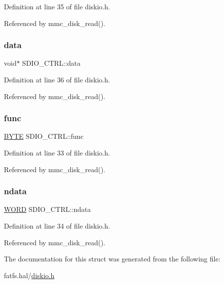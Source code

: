 Definition at line 35 of file diskio.\+h.



Referenced by mmc\+\_\+disk\+\_\+read().

\mbox{\label{structSDIO__CTRL_ab04c9adb4d3027a14925fb30b469f0c0}} 
\subsubsection{\texorpdfstring{data}{data}}
{\footnotesize\ttfamily void$\ast$ S\+D\+I\+O\+\_\+\+C\+T\+R\+L\+::data}



Definition at line 36 of file diskio.\+h.



Referenced by mmc\+\_\+disk\+\_\+read().

\mbox{\label{structSDIO__CTRL_a2f0a17848a6c7c58f826d1888469e6e3}} 
\subsubsection{\texorpdfstring{func}{func}}
{\footnotesize\ttfamily \hyperlink{integer_8h_a4ae1dab0fb4b072a66584546209e7d58}{B\+Y\+TE} S\+D\+I\+O\+\_\+\+C\+T\+R\+L\+::func}



Definition at line 33 of file diskio.\+h.



Referenced by mmc\+\_\+disk\+\_\+read().

\mbox{\label{structSDIO__CTRL_a44edc7d37688ac4f3a1ba3d66e909767}} 
\subsubsection{\texorpdfstring{ndata}{ndata}}
{\footnotesize\ttfamily \hyperlink{integer_8h_a197942eefa7db30960ae396d68339b97}{W\+O\+RD} S\+D\+I\+O\+\_\+\+C\+T\+R\+L\+::ndata}



Definition at line 34 of file diskio.\+h.



Referenced by mmc\+\_\+disk\+\_\+read().



The documentation for this struct was generated from the following file\+:\begin{DoxyCompactItemize}
\item 
fatfs.\+hal/\hyperlink{diskio_8h}{diskio.\+h}\end{DoxyCompactItemize}
